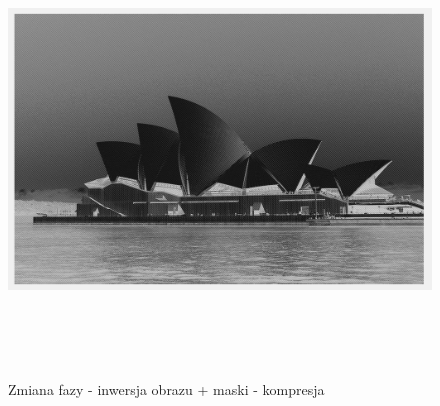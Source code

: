 \documentclass[a4paper,12pt]{article}
\begin{document}
\begin{justify}
\newpage

\begin{figure}[h!]
\centering
\includegraphics[width=18cm, height=12cm]{inwersja}
\caption{Zmiana fazy - inwersja obrazu + maski - kompresja}
\end{figure}

\end{justify}
\end{document}
